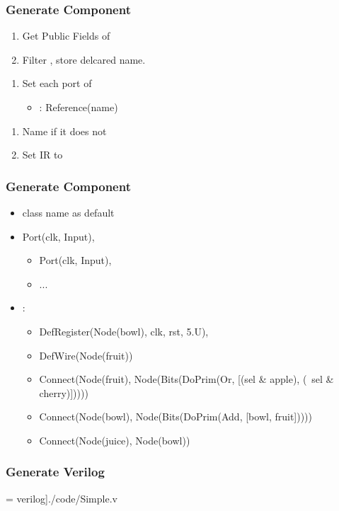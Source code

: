 \begin{frame}
  \frametitle{Generate Component}

  \begin{enumerate}
    \item Get Public Fields of \hbox{}
    \item Filter \hbox{}, store delcared name.
  \end{enumerate}

  \begin{enumerate}
  \item Set each port of  \rightarrow  {}
    \begin{itemize}
      \item {}: Reference(name)
    \end{itemize}
  \end{enumerate}

  \begin{enumerate}
    \item Name  if it does not \hbox{}
    \item Set \hbox{} IR to 
  \end{enumerate}

\end{frame}

\begin{frame}
  \frametitle{Generate Component}

  \begin{itemize}
    \item {} class name as default
    \item {} Port(clk, Input), 
      \begin{itemize}
        \item Port(clk, Input), 
        \item ...
      \end{itemize}
    \item {}:
      \begin{itemize}
        \item DefRegister(Node(bowl), clk, rst, 5.U), 
	\item DefWire(Node(fruit))
	\item Connect(Node(fruit), Node(Bits(DoPrim(Or, [(sel \& apple), (~sel \& cherry)]))))
	\item Connect(Node(bowl), Node(Bits(DoPrim(Add, [bowl, fruit]))))
	\item Connect(Node(juice), Node(bowl))
      \end{itemize}
  \end{itemize}

\end{frame}

\begin{frame}
  \frametitle{Generate Verilog}

   = verilog]{./code/Simple.v }
\end{frame}
